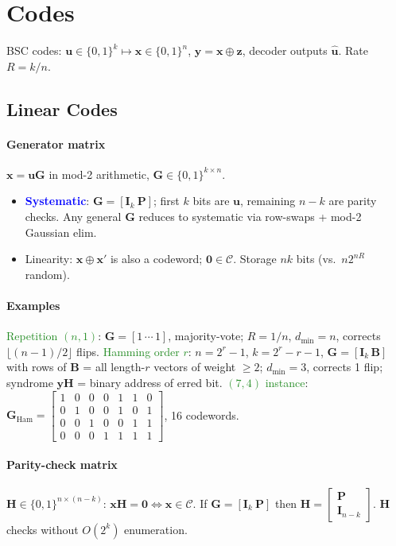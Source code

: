 \section{Codes}
BSC codes: $\mathbf u\in\{0,1\}^k\mapsto\mathbf x\in\{0,1\}^n$, $\mathbf y=\mathbf x\oplus\mathbf z$, decoder outputs $\hat{\mathbf u}$. Rate $R=k/n$.

\subsection{Linear Codes}
\paragraph{Generator matrix} $\mathbf x=\mathbf u\mathbf G$ in mod-2 arithmetic, $\mathbf G\in\{0,1\}^{k\times n}$.
\begin{itemize}
  \item \textcolor{Blue}{\textbf{Systematic}}: $\mathbf G=[\mathbf I_k\ \mathbf P]$; first $k$ bits are $\mathbf u$, remaining $n-k$ are parity checks. Any general $\mathbf G$ reduces to systematic via row-swaps + mod-2 Gaussian elim.
  \item \textcolor{Bittersweet}{Linearity}: $\mathbf x\oplus\mathbf x'$ is also a codeword; $\mathbf 0\in\mathcal C$. \textcolor{Bittersweet}{Storage} $nk$ bits (vs.\ $n2^{nR}$ random).
\end{itemize}
\paragraph{Examples}
\textcolor{ForestGreen}{Repetition $(n,1)$}: $\mathbf G{=}[1\,\cdots\,1]$, majority-vote; $R{=}1/n$, $d_{\min}{=}n$, corrects $\lfloor(n{-}1)/2\rfloor$ flips.
\textcolor{ForestGreen}{Hamming order $r$}: $n{=}2^r{-}1$, $k{=}2^r{-}r{-}1$, $\mathbf G{=}[\mathbf I_k\,\mathbf B]$ with rows of $\mathbf B$ = all length-$r$ vectors of weight $\ge 2$; $d_{\min}{=}3$, corrects 1 flip; syndrome $\mathbf y\mathbf H$ = binary address of erred bit.
\textcolor{ForestGreen}{$(7,4)$ instance}: $\mathbf G_{\text{Ham}}{=}\!\left[\begin{smallmatrix}1&0&0&0&1&1&0\\0&1&0&0&1&0&1\\0&0&1&0&0&1&1\\0&0&0&1&1&1&1\end{smallmatrix}\right]$, 16 codewords.

\paragraph{Parity-check matrix} $\mathbf H\in\{0,1\}^{n\times(n-k)}$: $\mathbf x\mathbf H=\mathbf 0\iff\mathbf x\in\mathcal C$. If $\mathbf G=[\mathbf I_k\ \mathbf P]$ then $\mathbf H=\left[\begin{smallmatrix}\mathbf P\\ \mathbf I_{n-k}\end{smallmatrix}\right]$. \textcolor{Bittersweet}{$\mathbf H$ checks} without $O(2^k)$ enumeration.

